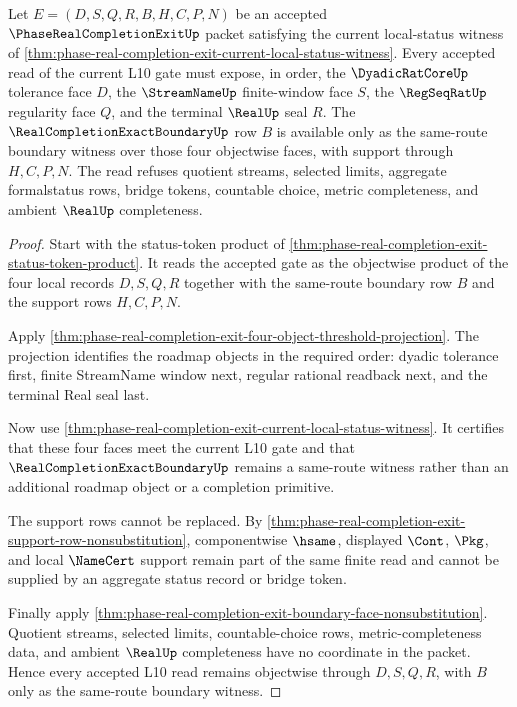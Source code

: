 \begin{theorem}
\label{thm:real-completion-exit-dyadic-stream-regularity}
Let $E=(D,S,Q,R,B,H,C,P,N)$ be an accepted $\PhaseRealCompletionExitUp$ packet satisfying the current local-status witness of \autoref{thm:phase-real-completion-exit-current-local-status-witness}. Every accepted read of the current L10 gate must expose, in order, the $\DyadicRatCoreUp$ tolerance face $D$, the $\StreamNameUp$ finite-window face $S$, the $\RegSeqRatUp$ regularity face $Q$, and the terminal $\RealUp$ seal $R$. The $\RealCompletionExactBoundaryUp$ row $B$ is available only as the same-route boundary witness over those four objectwise faces, with support through $H,C,P,N$. The read refuses quotient streams, selected limits, aggregate formalstatus rows, bridge tokens, countable choice, metric completeness, and ambient $\RealUp$ completeness.
\end{theorem}
\begin{proof}
Start with the status-token product of \autoref{thm:phase-real-completion-exit-status-token-product}. It reads the accepted gate as the objectwise product of the four local records $D,S,Q,R$ together with the same-route boundary row $B$ and the support rows $H,C,P,N$.

Apply \autoref{thm:phase-real-completion-exit-four-object-threshold-projection}. The projection identifies the roadmap objects in the required order: dyadic tolerance first, finite StreamName window next, regular rational readback next, and the terminal Real seal last.

Now use \autoref{thm:phase-real-completion-exit-current-local-status-witness}. It certifies that these four faces meet the current L10 gate and that $\RealCompletionExactBoundaryUp$ remains a same-route witness rather than an additional roadmap object or a completion primitive.

The support rows cannot be replaced. By \autoref{thm:phase-real-completion-exit-support-row-nonsubstitution}, componentwise $\hsame$, displayed $\Cont$, $\Pkg$, and local $\NameCert$ support remain part of the same finite read and cannot be supplied by an aggregate status record or bridge token.

Finally apply \autoref{thm:phase-real-completion-exit-boundary-face-nonsubstitution}. Quotient streams, selected limits, countable-choice rows, metric-completeness data, and ambient $\RealUp$ completeness have no coordinate in the packet. Hence every accepted L10 read remains objectwise through $D,S,Q,R$, with $B$ only as the same-route boundary witness.
\end{proof}

